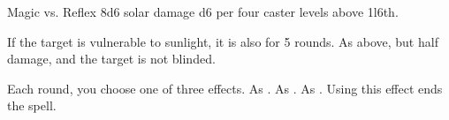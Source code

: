 \begin{spellheader}
    \begin{spelltargetinginfo}
    \end{spelltargetinginfo}
\end{spellheader}
\begin{spellcontent}
    \begin{spelleffects}
        \begin{spellattack}{Magic vs. Reflex}
            \spellsuccess 8d6 solar damage \add d6 per four caster levels above 1l6th.

            If the target is vulnerable to sunlight, it is also \blinded for 5 rounds.
            \spellfailure As above, but half damage, and the target is not blinded.
        \end{spellattack}
    \end{spelleffects}
\end{spellcontent}
\begin{spellfooter}

\end{spellfooter}

\begin{comment}
\subsubsection{T}
\end{comment}

\begin{spellheader}
    \spellrng{\rngmed}
\end{spellheader}
\begin{spellcontent}
    \spellspecial Each round, you choose one of three effects.
     As .
     As .
     As . Using this effect ends the spell.
\end{spellcontent}
\begin{spellfooter}

\end{spellfooter}

